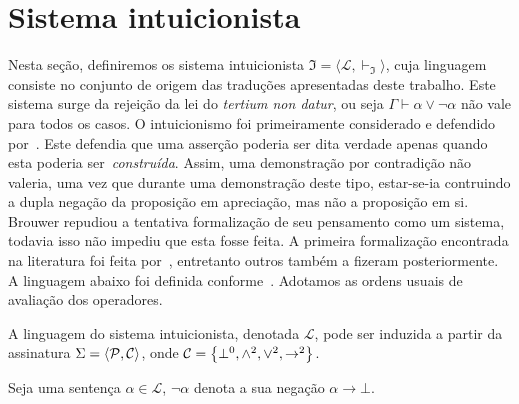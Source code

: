 \section{Sistema intuicionista}
    Nesta seção, definiremos os sistema intuicionista $\mathfrak{I}=\langle\mathcal{L},\vdash_\mathfrak{I}\rangle$, cuja linguagem consiste no conjunto de origem das traduções apresentadas deste trabalho.
    Este sistema surge da rejeição da lei do \textit{tertium non datur}, ou seja $\Gamma\vdash\alpha\vee\neg\alpha$ não vale para todos os casos.
    O intuicionismo foi primeiramente considerado e defendido por~\cite{Brouwer-A, Brouwer-B}.
    Este defendia que uma asserção poderia ser dita verdade apenas quando esta poderia ser~\emph{construída}.
    Assim, uma demonstração por contradição não valeria, uma vez que durante uma demonstração deste tipo, estar-se-ia contruindo a dupla negação da proposição em apreciação, mas não a proposição em si.
    Brouwer repudiou a tentativa formalização de seu pensamento como um sistema, todavia isso não impediu que esta fosse feita.
    A primeira formalização encontrada na literatura foi feita por~\cite{Kolmogorov}, entretanto outros também a fizeram posteriormente.
    A linguagem abaixo foi definida conforme~\cite{Troelstra}. Adotamos as ordens usuais de avaliação dos operadores.

    \vspace{\baselineskip}
    \begin{tcolorbox}[enhanced jigsaw, breakable, sharp corners, colframe=black, colback=white, boxrule=0.5pt, left=1.5mm, right=1.5mm, top=1.5mm, bottom=1.5mm]
    \begin{definition}[$\mathcal{L}$]\label{intuitionistic.language}
        A linguagem do sistema intuicionista, denotada $\mathcal{L}$, pode ser induzida a partir da assinatura $\Sigma=\langle\mathcal{P},\mathcal{C}\rangle$, onde $\mathcal{C}=\left\{\bot^0,\wedge^2,\vee^2,\to^2\right\}$.
    \end{definition}
    \end{tcolorbox}

    \begin{tcolorbox}[enhanced jigsaw, breakable, sharp corners, colframe=black, colback=white, boxrule=0.5pt, left=1.5mm, right=1.5mm, top=1.5mm, bottom=1.5mm]
    \begin{notation}
        Seja uma sentença $\alpha\in\mathcal{L}$, $\neg\alpha$ denota a sua negação $\alpha\to\bot$.
    \end{notation}
    \end{tcolorbox}

